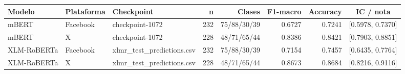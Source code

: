 \begin{tabular}{lllrrrrc}
\toprule
Modelo & Plataforma & Checkpoint & n & Clases & F1-macro & Accuracy & IC / nota \\
\midrule
mBERT & Facebook & checkpoint-1072 & 232 & 75/88/30/39 & 0.6727 & 0.7241 & [0.5978, 0.7370] \\
mBERT & X & checkpoint-1072 & 228 & 48/71/65/44 & 0.8386 & 0.8421 & [0.7903, 0.8851] \\
XLM-RoBERTa & Facebook & xlmr\_test\_predictions.csv & 232 & 75/88/30/39 & 0.7154 & 0.7457 & [0.6435, 0.7764] \\
XLM-RoBERTa & X & xlmr\_test\_predictions.csv & 228 & 48/71/65/44 & 0.8673 & 0.8684 & [0.8216, 0.9116] \\
\bottomrule
\end{tabular}
